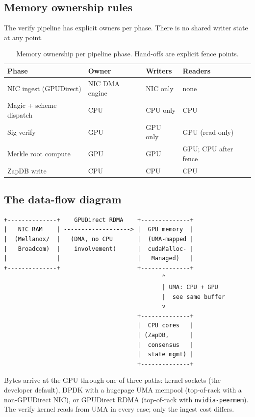 \subsection{Memory ownership rules}

The verify pipeline has explicit owners per phase. There is no
shared writer state at any point.

\begin{table}[h]
\centering
\small
\begin{tabular}{@{}lllp{2.5cm}@{}}
\toprule
\textbf{Phase} & \textbf{Owner} & \textbf{Writers} & \textbf{Readers} \\
\midrule
NIC ingest (GPUDirect) & NIC DMA engine & NIC only & none \\
Magic + scheme dispatch & CPU & CPU only & CPU \\
Sig verify & GPU & GPU only & GPU (read-only) \\
Merkle root compute & GPU & GPU & GPU; CPU after fence \\
ZapDB write & CPU & CPU & CPU \\
\bottomrule
\end{tabular}
\caption{Memory ownership per pipeline phase. Hand-offs are
explicit fence points.}
\label{tab:ownership}
\end{table}

\subsection{The data-flow diagram}

\begin{verbatim}
+--------------+    GPUDirect RDMA    +--------------+
|   NIC RAM    | -------------------> |  GPU memory  |
|  (Mellanox/  |   (DMA, no CPU       |  (UMA-mapped |
|   Broadcom)  |    involvement)      |  cudaMalloc- |
|              |                      |   Managed)   |
+--------------+                      +--------------+
                                             ^
                                             | UMA: CPU + GPU
                                             |  see same buffer
                                             v
                                      +--------------+
                                      |  CPU cores   |
                                      | (ZapDB,      |
                                      |  consensus   |
                                      |  state mgmt) |
                                      +--------------+
\end{verbatim}

Bytes arrive at the GPU through one of three paths: kernel
sockets (the developer default), DPDK with a hugepage UMA mempool
(top-of-rack with a non-GPUDirect NIC), or GPUDirect RDMA
(top-of-rack with \texttt{nvidia-peermem}). The verify kernel
reads from UMA in every case; only the ingest cost differs.
